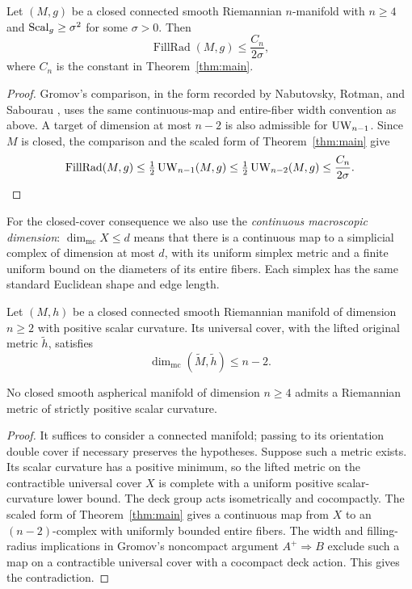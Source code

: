 \begin{corollary}
\label{cor:filling-radius}
Let \((M,g)\) be a closed connected smooth Riemannian \(n\)-manifold
with \(n\ge4\) and \(\operatorname{Scal}_g\ge\sigma^2\) for some \(\sigma>0\). Then
\[
 \operatorname{FillRad}(M,g)\le \frac{C_n}{2\sigma},
\]
where \(C_n\) is the constant in Theorem~\ref{thm:main}.
\end{corollary}

\begin{proof}
Gromov's comparison, in the form recorded by Nabutovsky, Rotman, and
Sabourau \citep[Definition~6.1 and equation~(6.1)]{nabutovskyRotmanSabourau2021},
uses the same continuous-map and entire-fiber width convention as above.
A target of dimension at most \(n-2\) is also admissible for
\(\operatorname{UW}_{n-1}\). Since \(M\) is closed, the comparison and the scaled
form of Theorem~\ref{thm:main} give
\[
 \operatorname{FillRad}(M,g)
 \le \tfrac12\operatorname{UW}_{n-1}(M,g)
 \le \tfrac12\operatorname{UW}_{n-2}(M,g)
 \le \frac{C_n}{2\sigma}.
\]
\end{proof}

For the closed-cover consequence we also use the \emph{continuous
macroscopic dimension}: $\dim_{\mathrm{mc}}X\le d$ means that there is a
continuous map to a simplicial complex of dimension at most $d$, with its uniform simplex metric
and a finite uniform bound on the diameters of its entire fibers.
Each simplex has the same standard Euclidean shape and edge length.

\begin{corollary}
\label{cover:main}
Let $(M,h)$ be a closed connected smooth Riemannian manifold of
dimension $n\ge2$ with positive scalar curvature.  Its universal cover,
with the lifted original metric $\widetilde h$, satisfies
\[
 \dim_{\mathrm{mc}}(\widetilde M,\widetilde h)\le n-2.
\]
\end{corollary}

\begin{corollary}\label{cor:aspherical}
No closed smooth aspherical manifold of dimension \(n\ge4\) admits
a Riemannian metric of strictly positive scalar curvature.
\end{corollary}

\begin{proof}
It suffices to consider a connected manifold; passing to its orientation
double cover if necessary preserves the hypotheses. Suppose such a metric
exists. Its scalar curvature has a positive minimum, so the lifted metric
on the contractible universal cover \(X\) is complete with a uniform
positive scalar-curvature lower bound. The deck group acts isometrically
and cocompactly. The scaled form of Theorem~\ref{thm:main} gives a
continuous map from \(X\) to an \((n-2)\)-complex with uniformly bounded
entire fibers. The width and filling-radius implications in Gromov's
noncompact argument \(A^+\Rightarrow B\)
\citep[\S3, pp.~6--8]{gromov2017Dozen} exclude such a map on a
contractible universal cover with a cocompact deck action. This gives
the contradiction.
\end{proof}

